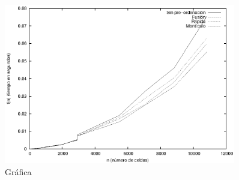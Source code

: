 \begin{figure}[!ht]
\begin{center}
  \includegraphics[width=0.9\textwidth]{graphic.eps}
  \caption{Gráfica}
\end{center}
\end{figure} 
